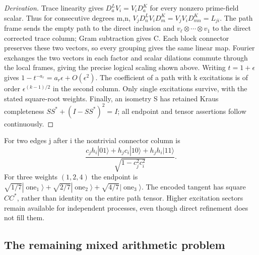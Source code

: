 \begin{proof}[Derivation]
Trace linearity gives $D_a^LV_i=V_iD_a^K$ for every nonzero prime-field
scalar. Thus for consecutive degrees m,n,
$V_jD_n^LV_iD_m^K=V_jV_iD_{mn}^K=L_{ji}$.
The path frame sends the empty path to the direct inclusion and
$v_\ell\otimes\cdots\otimes v_1$ to the direct corrected trace column;
Gram subtraction gives C. Each block connector preserves these two
vectors, so every grouping gives the same linear map. Fourier exchanges
the two vectors in each factor and scalar dilations commute through the
local frames, giving the precise logical scaling shown above.
Writing $t=1+\epsilon$ gives
$1-t^{-a_r}=a_r\epsilon+O(\epsilon^2)$. The coefficient of a path
with k excitations is of order $\epsilon^{(k-1)/2}$ in the second column.
Only single excitations survive, with the stated square-root weights.
Finally, an isometry S has retained Kraus completeness
$SS^*+(I-SS^*)^2=I$; all endpoint and tensor assertions follow continuously.
\end{proof}

For two edges j after i the nontrivial connector column is
\[
 \frac{c_jh_i|01\rangle+h_jc_i|10\rangle+h_jh_i|11\rangle}
 {\sqrt{1-c_j^2c_i^2}}.
\]
For three weights $(1,2,4)$ the endpoint is
$\sqrt{1/7}|\operatorname{one}_1\rangle+
\sqrt{2/7}|\operatorname{one}_2\rangle+
\sqrt{4/7}|\operatorname{one}_3\rangle$.
The encoded tangent has square $CC^*$, rather than identity on the entire
path tensor. Higher excitation sectors remain available for independent
processes, even though direct refinement does not fill them.

\subsection{The remaining mixed arithmetic problem}

